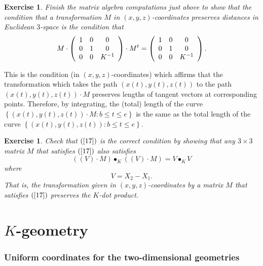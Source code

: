 \documentclass{article}%
\newtheorem{exercise}[theorem]{Exercise}
\begin{document}
\begin{exercise}
Finish the matrix algebra computations just above to show that the condition
that a transformation $M$ in $\left(  x,y,z\right)  $-coordinates preserves
distances in Euclidean $3$-space is the condition that%
\begin{equation}
M\cdot\left(
\begin{array}
[c]{ccc}%
1 & 0 & 0\\
0 & 1 & 0\\
0 & 0 & K^{-1}%
\end{array}
\right)  \cdot M^{t}=\left(
\begin{array}
[c]{ccc}%
1 & 0 & 0\\
0 & 1 & 0\\
0 & 0 & K^{-1}%
\end{array}
\right)  . \label{17}%
\end{equation}

\end{exercise}

This is the condition (in $\left(  x,y,z\right)  $-coordinates) which affirms
that the transformation which takes the path $\left(  x(t),y(t),z(t)\right)  $
to the path $\left(  x(t),y(t),z(t)\right)  \cdot M$ preserves lengths of
tangent vectors at corresponding points. Therefore, by integrating, the
(total) length of the curve $\left\{  \left(  x(t),y(t),z(t)\right)  \cdot
M:b\leq t\leq e\right\}  $ is the same as the total length of the curve
$\left\{  \left(  x(t),y(t),z(t)\right)  :b\leq t\leq e\right\}  $.

\begin{exercise}
Check that $\left(  \ref{17}\right)  $ is the correct condition by showing
that any $3\times3$ matrix $M$ that satisfies $\left(  \ref{17}\right)  $ also
satisfies%
\[
\left(  \left(  V\right)  \cdot M\right)  \bullet_{K}\left(  \left(  V\right)
\cdot M\right)  =V\bullet_{K}V
\]
where%
\[
V=X_{2}-X_{1}.
\]
That is, the transformation given in $\left(  x,y,z\right)  $-coordinates by a
matrix $M$ that satisfies $\left(  \ref{17}\right)  $ preserves the $K$-dot product.
\end{exercise}

\pagebreak

\part{$K$-geometry\label{III}}

\section{Uniform coordinates for the two-dimensional geometries}
\end{document}
